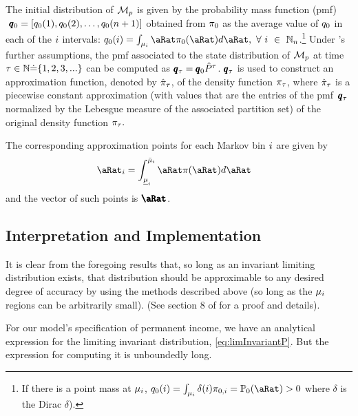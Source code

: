 \documentclass[\econtexRoot/BufferStockTheory.tex]{subfiles}
\begin{document}
The initial distribution of $\mathcal{M}_{p}$ is given by the probability mass function (pmf) $~\pmb{q}_{0} = [q_{0}(1),q_{0}(2),\dots,q_{0}(n+1)]$ obtained from $\pi_{0}$ as the average value of $q_{0}$ in each of the $i$ intervals: $\pmfBinNow_{0}(\thisBin)=\int_{\SetPartCnts_{\thisBin}} \pnt \DnsPnt_{0}(\pnt)d\pnt ,~\forall~\thisBin~\in~\Nteger_{\NumAprxStes}$.\footnote{If there is a point mass at $\mu_{i}$, $\pmfBinNow_{0}(\thisBin)=\int_{\SetPartCnts_\thisBin}\delta(\thisBin) \DnsPnt_{0,\thisBin}=\PrbEvntSqnc_{0}(\pnt)>0$ where $\delta$ is the Dirac $\delta$).}   Under \cite{saDiscrete}'s further assumptions, the {pmf} associated to the state distribution of $\mathcal{M}_{p}$ at time $\tau \in \mathbb{N} \dot{=} \{1,2,3,...\}$ can be computed as $\pmb{q}_{\tau}=\pmb{q}_{0}\hat{P}^{\tau}$.  $\pmb{q}_{\tau}$ is used to construct an approximation function, denoted by $\hat{\pi}_{\tau}$, of the density function $\pi_{\tau}$, where $\hat{\pi}_{\tau}$ is a piecewise constant approximation (with values that are the entries of the {pmf}~$\pmb{q}_{\tau}$ normalized by the Lebesgue measure of the associated partition set) of the original density function $\pi_{\tau}.$

The corresponding approximation points for each Markov bin $i$ are given by
\begin{align}
  \pnt_{\thisBin} & = \int_{\Bot{\SetPartCnts}_{\thisBin}}^{\Top{\SetPartCnts}_{\thisBin}} \pnt \DnsPnt(\pnt) d\pnt
\end{align}
and the vector of such points is $\vctr{\ValBinAprx}$.

\subsection{Interpretation and Implementation}

It is clear from the foregoing results that, so long as an invariant limiting distribution exists, that distribution should be approximable to any desired degree of accuracy by using the methods described above (so long as the $\mu_{i}$ regions can be arbitrarily small).  (See section 8 of \cite{saQuantitative} for a proof and details).

For our model's specification of permanent income, we have an analytical expression for the limiting invariant distribution, \eqref{eq:limInvariantP}.  But the expression for computing it is unboundedly long.
\end{document}
